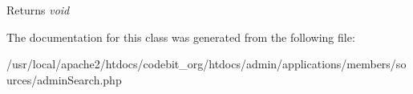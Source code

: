\begin{DoxyReturn}{Returns}
{\itshape void} 
\end{DoxyReturn}


The documentation for this class was generated from the following file\-:\begin{DoxyCompactItemize}
\item 
/usr/local/apache2/htdocs/codebit\-\_\-org/htdocs/admin/applications/members/sources/admin\-Search.\-php\end{DoxyCompactItemize}
